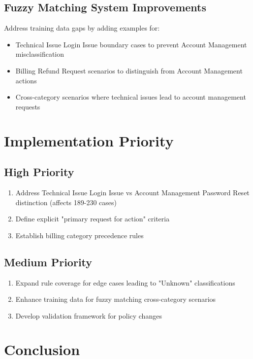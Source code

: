\documentclass[11pt, a4paper]{article}
\begin{document}
\subsection{Fuzzy Matching System Improvements}

Address training data gaps by adding examples for:
\begin{itemize}
\item Technical Issue Login Issue boundary cases to prevent Account Management misclassification
\item Billing Refund Request scenarios to distinguish from Account Management actions
\item Cross-category scenarios where technical issues lead to account management requests
\end{itemize}

\section{Implementation Priority}

\subsection{High Priority}
\begin{enumerate}
\item Address Technical Issue Login Issue vs Account Management Password Reset distinction (affects 189-230 cases)
\item Define explicit "primary request for action" criteria
\item Establish billing category precedence rules
\end{enumerate}

\subsection{Medium Priority}
\begin{enumerate}
\item Expand rule coverage for edge cases leading to "Unknown" classifications
\item Enhance training data for fuzzy matching cross-category scenarios
\item Develop validation framework for policy changes
\end{enumerate}

\section{Conclusion}
\end{document}
